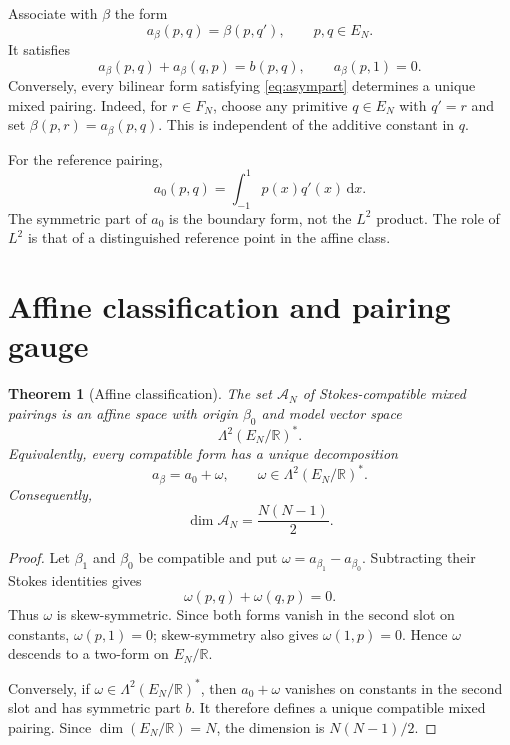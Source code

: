 \documentclass[11pt,a4paper]{article}
\newtheorem{theorem}{Theorem}[section]
\theoremstyle{definition}
\theoremstyle{remark}
\newcommand{\R}{\mathbb{R}}
\newcommand{\cA}{\mathcal{A}}
\newcommand{\dd}{\,\mathrm{d}}
\begin{document}
Associate with $\beta$ the form
\begin{equation}\label{eq:abeta}
 a_\beta(p,q)=\beta(p,q'),\qquad p,q\in E_N.
\end{equation}
It satisfies
\begin{equation}\label{eq:asympart}
 a_\beta(p,q)+a_\beta(q,p)=b(p,q),
 \qquad a_\beta(p,1)=0.
\end{equation}
Conversely, every bilinear form satisfying \eqref{eq:asympart} determines a unique mixed
pairing.  Indeed, for $r\in F_N$, choose any primitive $q\in E_N$ with $q'=r$ and set
$\beta(p,r)=a_\beta(p,q)$.  This is independent of the additive constant in $q$.

For the reference pairing,
\[
 a_0(p,q)=\int_{-1}^{1}p(x)q'(x)\dd x.
\]
The symmetric part of $a_0$ is the boundary form, not the $L^2$ product.  The role of
$L^2$ is that of a distinguished reference point in the affine class.

\section{Affine classification and pairing gauge}

\begin{theorem}[Affine classification]\label{thm:affine}
The set $\cA_N$ of Stokes-compatible mixed pairings is an affine space with origin
$\beta_0$ and model vector space
\[
 \Lambda^2(E_N/\R)^*.
\]
Equivalently, every compatible form has a unique decomposition
\begin{equation}\label{eq:gaugedecomposition}
 a_\beta=a_0+\omega,
 \qquad
 \omega\in\Lambda^2(E_N/\R)^*.
\end{equation}
Consequently,
\begin{equation}\label{eq:gaugedimension}
 \dim\cA_N=\frac{N(N-1)}2.
\end{equation}
\end{theorem}

\begin{proof}
Let $\beta_1$ and $\beta_0$ be compatible and put
$\omega=a_{\beta_1}-a_{\beta_0}$.  Subtracting their Stokes identities gives
\[
 \omega(p,q)+\omega(q,p)=0.
\]
Thus $\omega$ is skew-symmetric.  Since both forms vanish in the second slot on constants,
$\omega(p,1)=0$; skew-symmetry also gives $\omega(1,p)=0$.  Hence $\omega$ descends to a
two-form on $E_N/\R$.

Conversely, if $\omega\in\Lambda^2(E_N/\R)^*$, then $a_0+\omega$ vanishes on constants in
the second slot and has symmetric part $b$.  It therefore defines a unique compatible mixed
pairing.  Since $\dim(E_N/\R)=N$, the dimension is $N(N-1)/2$.
\end{proof}
\end{document}
